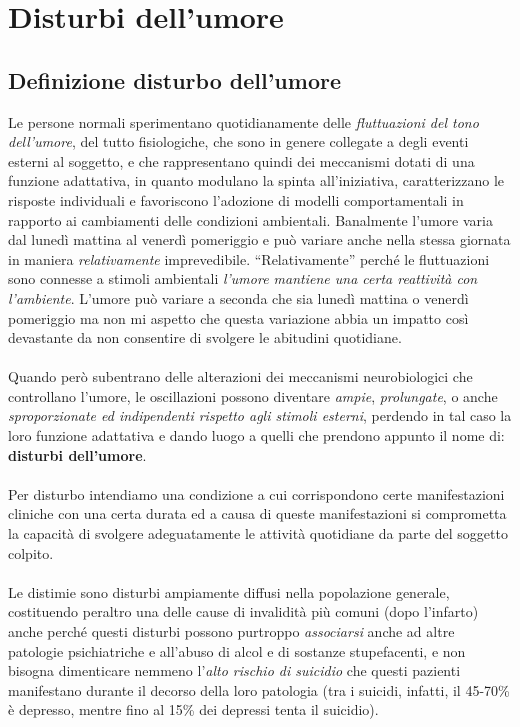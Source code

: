 \section{Disturbi dell'umore}

\subsection{Definizione disturbo dell'umore}

Le persone normali sperimentano quotidianamente delle \emph{fluttuazioni
del tono dell'umore}, del tutto fisiologiche, che sono in genere
collegate a degli eventi esterni al soggetto, e che rappresentano quindi
dei meccanismi dotati di una funzione adattativa, in quanto modulano la
spinta all'iniziativa, caratterizzano le risposte individuali e
favoriscono l'adozione di modelli comportamentali in rapporto ai
cambiamenti delle condizioni ambientali. Banalmente l'umore varia dal
lunedì mattina al venerdì pomeriggio e può variare anche nella stessa
giornata in maniera \emph{relativamente} imprevedibile.
``Relativamente'' perché le fluttuazioni sono connesse a stimoli
ambientali \emph{l'umore mantiene una certa reattività con l'ambiente}.
L'umore può variare a seconda che sia lunedì mattina o venerdì
pomeriggio ma non mi aspetto che questa variazione abbia un impatto così
devastante da non consentire di svolgere le abitudini quotidiane.
\\\\
Quando però subentrano delle alterazioni dei meccanismi neurobiologici
che controllano l'umore, le oscillazioni possono diventare \emph{ampie},
\emph{prolungate}, o anche \emph{sproporzionate ed indipendenti rispetto
agli stimoli esterni}, perdendo in tal caso la loro funzione adattativa
e dando luogo a quelli che prendono appunto il nome di: \textbf{disturbi
dell'umore}.
\\\\
Per disturbo intendiamo una condizione a cui corrispondono certe
manifestazioni cliniche con una certa durata ed a causa di queste
manifestazioni si comprometta la capacità di svolgere adeguatamente le
attività quotidiane da parte del soggetto colpito.
\\\\
Le distimie sono disturbi ampiamente diffusi nella popolazione generale,
costituendo peraltro una delle cause di invalidità più comuni (dopo
l'infarto) anche perché questi disturbi possono purtroppo
\emph{associarsi} anche ad altre patologie psichiatriche e all'abuso di
alcol e di sostanze stupefacenti, e non bisogna dimenticare nemmeno
l'\emph{alto rischio di suicidio} che questi pazienti manifestano
durante il decorso della loro patologia (tra i suicidi, infatti, il
45-70\% è depresso, mentre fino al 15\% dei depressi tenta il suicidio).

